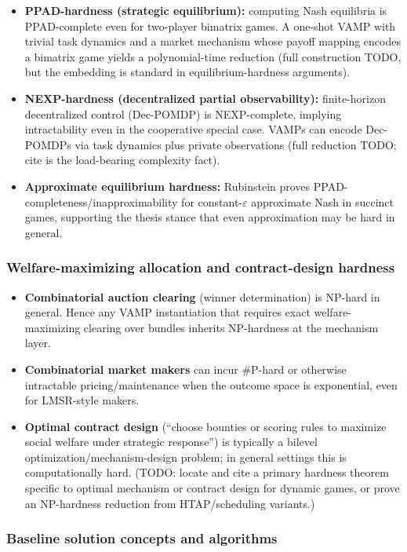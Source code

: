 \begin{itemize}
\item \textbf{PPAD-hardness (strategic equilibrium):} computing Nash equilibria is PPAD-complete even for two-player bimatrix games. A one-shot VAMP with trivial task dynamics and a market mechanism whose payoff mapping encodes a bimatrix game yields a polynomial-time reduction (full construction TODO, but the embedding is standard in equilibrium-hardness arguments).
\item \textbf{NEXP-hardness (decentralized partial observability):} finite-horizon decentralized control (Dec-POMDP) is NEXP-complete, implying intractability even in the cooperative special case. VAMPs can encode Dec-POMDPs via task dynamics plus private observations (full reduction TODO; cite is the load-bearing complexity fact).
\item \textbf{Approximate equilibrium hardness:} Rubinstein proves PPAD-completeness/inapproximability for constant-\(\varepsilon\) approximate Nash in succinct games, supporting the thesis stance that even approximation may be hard in general.
\end{itemize}

\subsubsection{Welfare-maximizing allocation and contract-design hardness}

\begin{itemize}
\item \textbf{Combinatorial auction clearing} (winner determination) is NP-hard in general. Hence any VAMP instantiation that requires exact welfare-maximizing clearing over bundles inherits NP-hardness at the mechanism layer.
\item \textbf{Combinatorial market makers} can incur \#P-hard or otherwise intractable pricing/maintenance when the outcome space is exponential, even for LMSR-style makers.
\item \textbf{Optimal contract design} (``choose bounties or scoring rules to maximize social welfare under strategic response'') is typically a bilevel optimization/mechanism-design problem; in general settings this is computationally hard. (TODO: locate and cite a primary hardness theorem specific to optimal mechanism or contract design for dynamic games, or prove an NP-hardness reduction from HTAP/scheduling variants.)
\end{itemize}

\subsubsection{Baseline solution concepts and algorithms}

